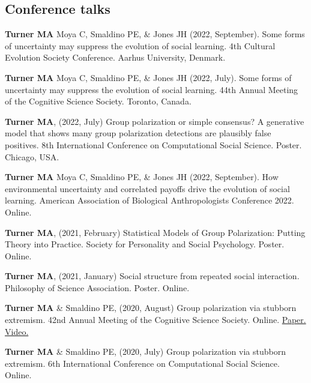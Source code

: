 \documentclass[11pt, letterpaper]{article}
\begin{document}
\subsection{Conference talks}

    \textbf{Turner MA} Moya C, Smaldino PE, \& Jones JH (2022, September). Some forms of
    uncertainty may suppress the evolution of social learning. 4th Cultural Evolution Society
    Conference. Aarhus University, Denmark. 

    \textbf{Turner MA} Moya C, Smaldino PE, \& Jones JH (2022, July). Some forms of
    uncertainty may suppress the evolution of social learning. 44th Annual Meeting of the
    Cognitive Science Society. Toronto, Canada. 

    \textbf{Turner MA}, (2022, July) Group polarization or simple consensus?
    A generative model that shows many group polarization detections are
    plausibly false positives. 8th International Conference on Computational
    Social Science. Poster. Chicago, USA.

 \textbf{Turner MA} Moya C, Smaldino PE, \& Jones JH (2022, September). How
 environmental uncertainty and correlated payoffs drive the evolution of social
 learning. American Association of Biological Anthropologists Conference 2022.
 Online.

    \textbf{Turner MA}, (2021, February) Statistical Models of Group Polarization: Putting Theory into Practice. Society for Personality and Social Psychology. Poster. Online.

    \textbf{Turner MA}, (2021, January) Social structure from repeated social interaction. Philosophy of Science Association. Poster. Online.

    \textbf{Turner MA} \& Smaldino PE, (2020, August) Group polarization via stubborn extremism. 42nd Annual Meeting of the Cognitive Science Society. Online. \href{https://www.researchgate.net/publication/342153646_Stubborn_extremism_as_a_potential_pathway_to_group_polarization}{Paper.} \href{https://youtu.be/i5PHjwu1p40}{Video.}

   \textbf{Turner MA} \& Smaldino PE, (2020, July) Group polarization via stubborn extremism. 6th International Conference on Computational Social Science. Online.
\end{document}
